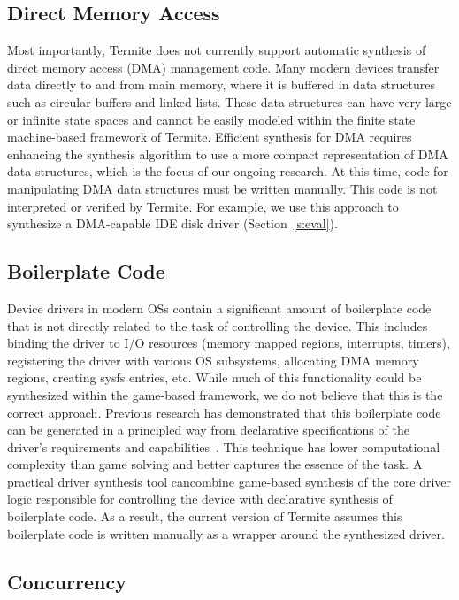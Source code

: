 \documentclass[a4paper,twoside,openright,11pt]{book}
\newcommand{\termite}{Termite\xspace}
\theoremstyle{definition}
\begin{document}
\subsection{Direct Memory Access}

Most importantly, \termite does not currently support automatic synthesis of direct memory access (DMA) management code.  Many modern devices transfer data directly to and from main memory, where it is buffered in data structures such as circular buffers and linked lists.  These data structures can have very large or infinite state spaces and cannot be easily modeled within the finite state machine-based framework of \termite.  Efficient synthesis for DMA requires enhancing the synthesis algorithm to use a more compact representation of DMA data structures, which is the focus of our ongoing research.  At this time, code for manipulating DMA data structures must be written manually.  This code is not interpreted or verified by \termite.  For example, we use this approach to synthesize a DMA-capable IDE disk driver (Section~\ref{s:eval}).

\subsection{Boilerplate Code}

Device drivers in modern OSs contain a significant amount of boilerplate code that is not directly related to the task of controlling the device.  This includes binding the driver to I/O resources (memory mapped regions, interrupts, timers), registering the driver with various OS subsystems, allocating DMA memory regions, creating sysfs entries, etc.  While much of this functionality could be synthesized within the game-based framework, we do not believe that this is the correct approach.  Previous research has demonstrated that this boilerplate code can be generated in a principled way from declarative specifications of the driver's requirements and capabilities~\cite{Spear_RHHL_06}.  This technique has lower computational complexity than game solving and better captures the essence of the task.  A practical driver synthesis tool cancombine game-based synthesis of the core driver logic responsible for controlling the device with declarative synthesis of boilerplate code.  As a result, the current version of \termite assumes this boilerplate code is written manually as a wrapper around the synthesized driver.

\subsection{Concurrency}
\end{document}
